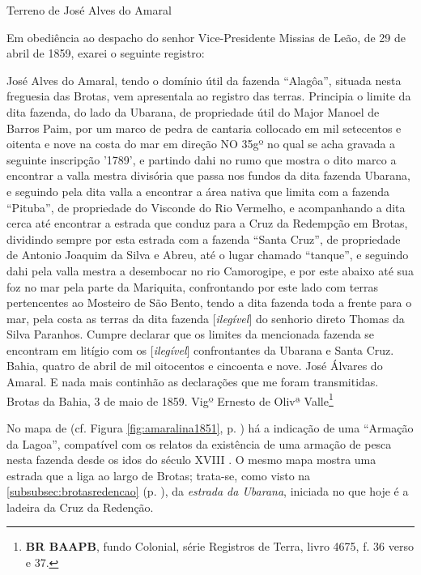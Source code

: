 \begin{citacao}
Terreno de José Alves do Amaral

Em obediência ao despacho do senhor Vice-Presidente Missias de Leão, de 29 de abril de 1859, exarei o seguinte registro:

José Alves do Amaral, tendo o domínio útil da fazenda ``Alagôa'', situada nesta freguesia das Brotas, vem apresentala ao registro das terras. Principia o limite da dita fazenda, do lado da Ubarana, de propriedade útil do Major Manoel de Barros Paim, por um marco de pedra de cantaria collocado em mil setecentos e oitenta e nove na costa do mar em direção NO 35gº no qual se acha gravada a seguinte inscripção '1789', e partindo dahi no rumo que mostra o dito marco a encontrar a valla mestra divisória que passa nos fundos da dita fazenda Ubarana, e seguindo pela dita valla a encontrar a área nativa que limita com a fazenda ``Pituba'', de propriedade do Visconde do Rio Vermelho, e acompanhando a dita cerca até encontrar a estrada que conduz para a Cruz da Redempção em Brotas, dividindo sempre por esta estrada com a fazenda ``Santa Cruz'', de propriedade de Antonio Joaquim da Silva e Abreu, até o lugar chamado ``tanque'', e seguindo dahi pela valla mestra a desembocar no rio Camorogipe, e por este abaixo até sua foz no mar pela parte da Mariquita, confrontando por este lado com terras pertencentes ao Mosteiro de São Bento, tendo a dita fazenda toda a frente para o mar, pela costa as terras da dita fazenda [\textit{ilegível}] do senhorio direto Thomas da Silva Paranhos. Cumpre declarar que os limites da mencionada fazenda se encontram em litígio com os [\textit{ilegível}] confrontantes da Ubarana e Santa Cruz. Bahia, quatro de abril de mil oitocentos e cincoenta e nove. José Álvares do Amaral. E nada mais continhão as declarações que me foram transmitidas. Brotas da Bahia, 3 de maio de 1859. Vigº Ernesto de Olivª Valle\footnote{\textbf{BR BAAPB}, fundo Colonial, série Registros de Terra, livro 4675, f. 36 verso e 37.}
\end{citacao}

No mapa de  (cf. Figura \autoref{fig:amaralina1851}, p. \pageref{fig:amaralina1851}) há a indicação de uma ``Armação da Lagoa'', compatível com os relatos da existência de uma armação de pesca nesta fazenda desde os idos do século XVIII \cite[p.~120-121]{campos_alagoa_1942}. O mesmo mapa mostra uma estrada que a liga ao largo de Brotas; trata-se, como visto na \autoref{subsubsec:brotasredencao} (p. \pageref{subsubsec:brotasredencao}), da \textit{estrada da Ubarana}, iniciada no que hoje é a ladeira da Cruz da Redenção.

